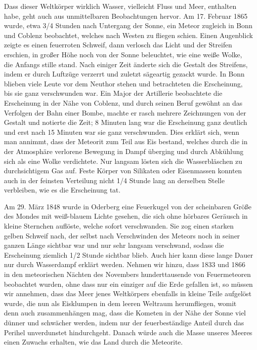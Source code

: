 \documentclass[a4paper, 11pt, oneside, german]{article}
\begin{document}
Dass dieser Weltkörper wirklich Wasser, vielleicht Fluss und Meer, enthalten habe, geht auch aus unmittelbaren Beobachtungen hervor. Am 17. Februar 1865 wurde, etwa 3/4 Stunden nach Untergang der Sonne, ein Meteor zugleich in Bonn und Coblenz beobachtet, welches nach Westen zu fliegen schien. Einen Augenblick zeigte es einen feuerroten Schweif, dann verlosch das Licht und der Streifen erschien, in großer Höhe noch von der Sonne beleuchtet, wie eine weiße Wolke, die Anfangs stille stand. Nach einiger Zeit änderte sich die Gestalt des Streifens, indem er durch Luftzüge verzerrt und zuletzt sägeartig gezackt wurde. In Bonn blieben viele Leute vor dem Neuthor stehen und betrachteten die Erscheinung, bis sie ganz verschwunden war. Ein Major der Artillerie beobachtete die Erscheinung in der Nähe von Coblenz, und durch seinen Beruf gewöhnt an das Verfolgen der Bahn einer Bombe, machte er rasch mehrere Zeichnungen von der Gestalt und notierte die Zeit; 8 Minuten lang war die Erscheinung ganz deutlich und erst nach 15 Minuten war sie ganz verschwunden. Dies erklärt sich, wenn man annimmt, dass der Meteorit zum Teil aus Eis bestand, welches durch die in der Atmosphäre verlorene Bewegung in Dampf überging und durch Abkühlung sich als eine Wolke verdichtete. Nur langsam lösten sich die Wasserbläschen zu durchsichtigem Gas auf. Feste Körper von Silikaten oder Eisenmassen konnten auch in der feinsten Verteilung nicht 1/4 Stunde lang an derselben Stelle verbleiben, wie es die Erscheinung tat.

Am 29. März 1848 wurde in Oderberg eine Feuerkugel von der scheinbaren Größe des Mondes mit weiß-blauem Lichte gesehen, die sich ohne hörbares Geräusch in kleine Sternchen auflöste, welche sofort verschwanden. Sie zog einen starken gelben Schweif nach, der selbst nach Verschwinden des Meteors noch in seiner ganzen Länge sichtbar war und nur sehr langsam verschwand, sodass die Erscheinung ziemlich 1/2 Stunde sichtbar blieb. Auch hier kann diese lange Dauer nur durch Wasserdampf erklärt werden. Nehmen wir hinzu, dass 1833 und 1866 in den meteorischen Nächten des Novembers hunderttausende von Feuermeteoren beobachtet wurden, ohne dass nur ein einziger auf die Erde gefallen ist, so müssen wir annehmen, dass das Meer jenes Weltkörpers ebenfalls in kleine Teile aufgelöst wurde, die nun als Eisklumpen in dem leeren Weltraum herumfliegen, womit denn auch zusammenhängen mag, dass die Kometen in der Nähe der Sonne viel dünner und schwächer werden, indem nur der feuerbeständige Anteil durch das Perihel unverdunstet hindurchgeht. Danach würde auch die Masse unseres Meeres einen Zuwachs erhalten, wie das Land durch die Meteorite.
\end{document}
